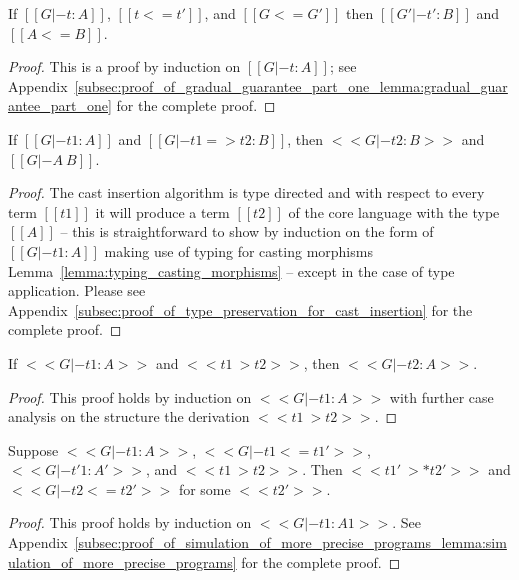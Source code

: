 \begin{lemma}
  \label{lemma:gradual_guarantee_part_one}
  If $[[G |- t : A]]$, $[[t <= t']]$, and $[[G <= G']]$ then $[[G' |- t' : B]]$ and $[[A <= B]]$.
\end{lemma}
\begin{proof}
  This is a proof by induction on $[[G |- t : A]]$; see
  Appendix~\ref{subsec:proof_of_gradual_guarantee_part_one_lemma:gradual_guarantee_part_one}
  for the complete proof.
\end{proof}

\begin{lemma}
  \label{lemma:type_preservation_for_cast_insertion}
  If $[[G |- t1 : A]]$ and $[[G |- t1 => t2 : B]]$, then $<<G |- t2 : B>>$ and $[[G |- A ~ B]]$.
\end{lemma}
\begin{proof}
  The cast insertion algorithm is type directed and with respect to
  every term $[[t1]]$ it will produce a term $[[t2]]$ of the core
  language with the type $[[A]]$ -- this is straightforward to show by
  induction on the form of $[[G |- t1 : A]]$ making use of typing for
  casting morphisms Lemma~\ref{lemma:typing_casting_morphisms} --
  except in the case of type application.  Please see
  Appendix~\ref{subsec:proof_of_type_preservation_for_cast_insertion}
  for the complete proof.
\end{proof}

\begin{lemma}
  \label{lemma:type_preservation}
  If $<<G |- t1 : A>>$ and $<<t1 ~> t2>>$, then $<<G |- t2 : A>>$.
\end{lemma}
\begin{proof}
  This proof holds by induction on $<<G |- t1 : A>>$ with further case
  analysis on the structure the derivation $<<t1 ~> t2>>$.
\end{proof}

\begin{lemma}
  \label{lemma:simulation_of_more_precise_programs}
  Suppose $<<G |- t1 : A>>$, $<<G |- t1 <= t1'>>$, $<<G |- t'1 : A'>>$, and $<<t1 ~> t2>>$.
  Then $<<t1' ~>* t2'>>$ and $<<G |- t2 <= t2'>>$ for some $<<t2'>>$.
\end{lemma}
\begin{proof}
  This proof holds by induction on $<<G |- t1 : A1>>$.  See
  Appendix~\ref{subsec:proof_of_simulation_of_more_precise_programs_lemma:simulation_of_more_precise_programs}
  for the complete proof.
\end{proof}

